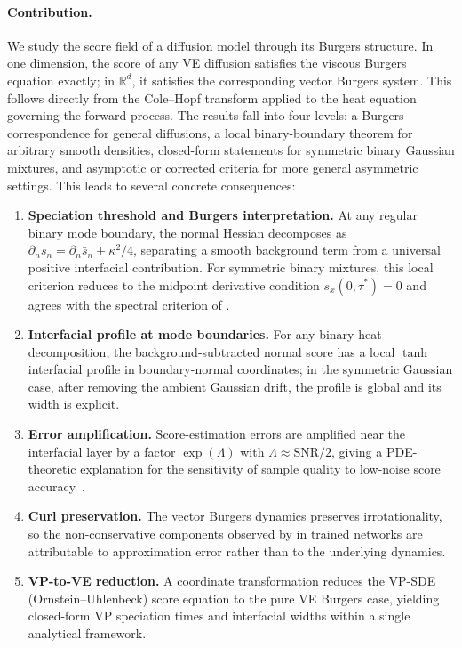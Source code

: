 \documentclass[11pt]{article}
\newcommand{\R}{\mathbb{R}}
\begin{document}
\paragraph{Contribution.}
We study the score field of a diffusion model through its Burgers structure.
In one dimension, the score of any VE diffusion satisfies the viscous Burgers equation exactly; in $\R^d$, it satisfies the corresponding vector Burgers system.
This follows directly from the Cole--Hopf transform applied to the heat equation governing the forward process.
The results fall into four levels: a Burgers correspondence for general diffusions, a local binary-boundary theorem for arbitrary smooth densities, closed-form statements for symmetric binary Gaussian mixtures, and asymptotic or corrected criteria for more general asymmetric settings.
This leads to several concrete consequences:

\begin{enumerate}[label=(\roman*),leftmargin=2em]
\item \textbf{Speciation threshold and Burgers interpretation.}
At any regular binary mode boundary, the normal Hessian decomposes as $\partial_n s_n = \partial_n \bar s_n + \kappa^2/4$, separating a smooth background term from a universal positive interfacial contribution.
For symmetric binary mixtures, this local criterion reduces to the midpoint derivative condition $s_x(0,\tau^\ast)=0$ and agrees with the spectral criterion of \citet{biroli2024dynamical}.

\item \textbf{Interfacial profile at mode boundaries.}
For any binary heat decomposition, the background-subtracted normal score has a local $\tanh$ interfacial profile in boundary-normal coordinates; in the symmetric Gaussian case, after removing the ambient Gaussian drift, the profile is global and its width is explicit.

\item \textbf{Error amplification.}
Score-estimation errors are amplified near the interfacial layer by a factor $\exp(\Lambda)$ with $\Lambda \approx \mathrm{SNR}/2$, giving a PDE-theoretic explanation for the sensitivity of sample quality to low-noise score accuracy~\citep{song2020improved, karras2022elucidating}.

\item \textbf{Curl preservation.}
The vector Burgers dynamics preserves irrotationality, so the non-conservative components observed by \citet{vuong2025score} in trained networks are attributable to approximation error rather than to the underlying dynamics.

\item \textbf{VP-to-VE reduction.}
A coordinate transformation reduces the VP-SDE (Ornstein--Uhlenbeck) score equation to the pure VE Burgers case, yielding closed-form VP speciation times and interfacial widths within a single analytical framework.
\end{enumerate}
\end{document}
